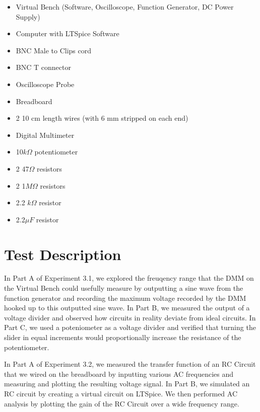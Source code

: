 \documentclass[10pt]{article}
\begin{document}
\begin{itemize}
	\item Virtual Bench (Software, Oscilloscope, Function Generator, DC Power Supply)
	\item Computer with LTSpice Software 
	\item BNC Male to Clips cord
	\item BNC T connector
	\item Oscilloscope Probe
	\item Breadboard
	\item 2 10 cm length wires (with 6 mm stripped on each end)
	\item Digital Multimeter
	\item 10$k\Omega$ potentiometer
	\item 2 47$\Omega$ resistors
	\item 2 1$M\Omega$ resistors
	\item 2.2 $k\Omega$ resistor
	\item 2.2$\mu F$ resistor
	
\end{itemize}

\medskip


\section{Test Description}
In Part A of Experiment 3.1, we explored the freuqency range that the DMM on the Virtual Bench could usefully measure by outputting a sine wave from the function generator and recording the maximum voltage recorded by the DMM hooked up to this outputted sine wave. In Part B, we measured the output of a voltage divider and observed how circuits in reality deviate from ideal circuits. In Part C, we used a poteniometer as a voltage divider and verified that turning the slider in equal increments would proportionally increase the resistance of the potentiometer. 

In Part A of Experiment 3.2, we measured the transfer function of an RC Circuit that we wired on the breadboard by inputting various AC frequencies and measuring and plotting the resulting voltage signal. In Part B, we simulated an RC circuit by creating a virtual circuit on LTSpice. We then performed AC analysis by plotting the gain of the RC Circuit over a wide frequency range.  
\end{document}
